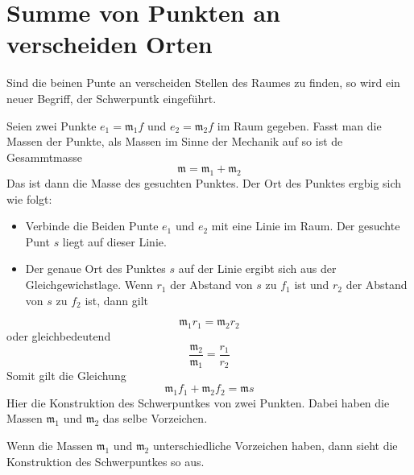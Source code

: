 \documentclass{sajzk}
\begin{document}
\section{Summe von Punkten an verscheiden Orten}
\label{9gpd}

Sind die beinen Punte an verscheiden Stellen des Raumes zu finden, so wird ein
neuer Begriff, der Schwerpuntk eingeführt.

Seien zwei Punkte $e_1 = \mathfrak{m}_1f$ und $e_2 = \mathfrak{m}_2f$ im Raum
gegeben. Fasst man die Massen der Punkte, als Massen im Sinne der Mechanik auf
so ist de Gesammtmasse
$$\mathfrak{m} = \mathfrak{m}_1 + \mathfrak{m}_2$$
Das ist dann die Masse des gesuchten Punktes. Der Ort des Punktes ergbig sich
wie folgt:
\begin{itemize}
\item Verbinde die Beiden Punte $e_1$ und $e_2$ mit eine Linie im Raum. Der
  gesuchte Punt $s$ liegt auf dieser Linie.
\item Der genaue Ort des Punktes $s$ auf der Linie ergibt sich aus der
  Gleichgewichstlage. Wenn $r_1$ der Abstand von $s$ zu $f_1$ ist und $r_2$ der
  Abstand von $s$ zu $f_2$ ist, dann gilt
\end{itemize}
$$\mathfrak{m}_1r_1 =\mathfrak{m}_2r_2$$
oder gleichbedeutend
$$\frac{\mathfrak{m}_2}{\mathfrak{m}_1} =\frac{r_1}{r_2}$$
Somit gilt die Gleichung
$$\mathfrak{m}_1f_1 + \mathfrak{m}_2f_2 = \mathfrak{m}s$$
Hier die Konstruktion des Schwerpuntkes von zwei Punkten. Dabei haben die Massen
$\mathfrak{m}_1$ und $\mathfrak{m}_2$ das selbe Vorzeichen.

\begin{center}
\end{center}
Wenn die Massen $\mathfrak{m}_1$ und $\mathfrak{m}_2$ unterschiedliche
Vorzeichen haben, dann sieht die Konstruktion des Schwerpuntkes so aus.
\end{document}
